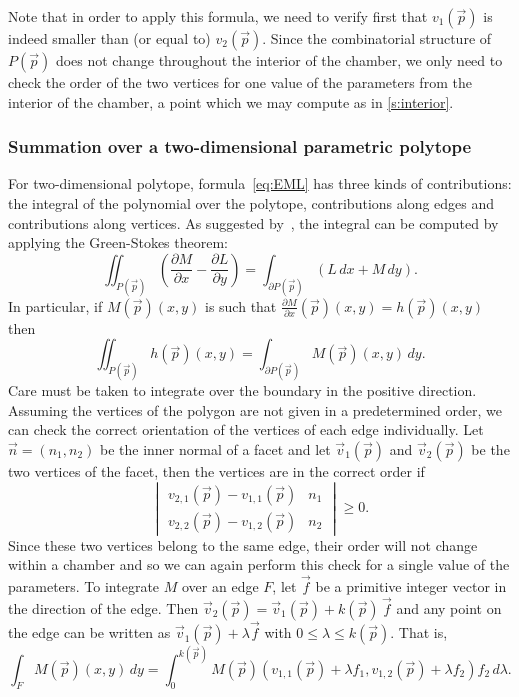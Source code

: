 Note that in order to apply this formula, we need to verify
first that $v_1(\vec p)$ is indeed smaller than (or equal to)
$v_2(\vec p)$.  Since the combinatorial structure of $P(\vec p)$
does not change throughout the interior of the chamber, we only
need to check the order of the two vertices for one value
of the parameters from the interior of the chamber, a point
which we may compute as in \autoref{s:interior}.

\subsubsection{Summation over a two-dimensional parametric polytope}

For two-dimensional polytope, formula~\eqref{eq:EML} has three kinds
of contributions: the integral of the polynomial over the polytope,
contributions along edges and contributions along vertices.
As suggested by~, the integral can be computed
by applying the Green-Stokes theorem:
$$
    \iint_{P(\vec p)}
    \left(\frac{\partial M}{\partial x} - \frac{\partial L}{\partial y}\right) =
    \int_{\partial P(\vec p)} (L\, dx + M\, dy)
.
$$
In particular, if $M(\vec p)(x,y)$ is such that
$\frac{\partial M}{\partial x}(\vec p)(x,y) = h(\vec p)(x,y)$
then
$$
    \iint_{P(\vec p)} h(\vec p)(x,y) =
    \int_{\partial P(\vec p)} M(\vec p)(x,y) \, dy
.
$$
Care must be taken to integrate over the boundary in the positive
direction.  Assuming the vertices of the polygon are not given
in a predetermined order, we can check the correct orientation
of the vertices of each edge individually.  Let $\vec n = (n_1, n_2)$
be the inner normal of a facet and let $\vec v_1(\vec p)$
and $\vec v_2(\vec p)$ be the two vertices of the facet, then
the vertices are in the correct order if
$$
\begin{vmatrix}
v_{2,1}(\vec p)-v_{1,1}(\vec p) & n_1
\\
v_{2,2}(\vec p)-v_{1,2}(\vec p) & n_2
\end{vmatrix}
\ge 0
.
$$
Since these two vertices belong to the same edge, their order
will not change within a chamber and so we can again perform
this check for a single value of the parameters.
To integrate $M$ over an edge $F$, let $\vec f$ be a primitive
integer vector in the direction of the edge.
Then $\vec v_2(\vec p) = \vec v_1(\vec p) + k(\vec p) \, \vec f$
and any point on the edge can be written as
$\vec v_1(\vec p) + \lambda \vec f$ with
$0 \le \lambda \le k(\vec p)$.
That is,
\begin{equation}
\label{eq:EML:int}
\int_F M(\vec p)(x,y) \, dy
=
\int_0^{k(\vec p)}
    M(\vec p)(v_{1,1}(\vec p) + \lambda f_1,
	      v_{1,2}(\vec p) + \lambda f_2)
    f_2 \, d\lambda
.
\end{equation}

